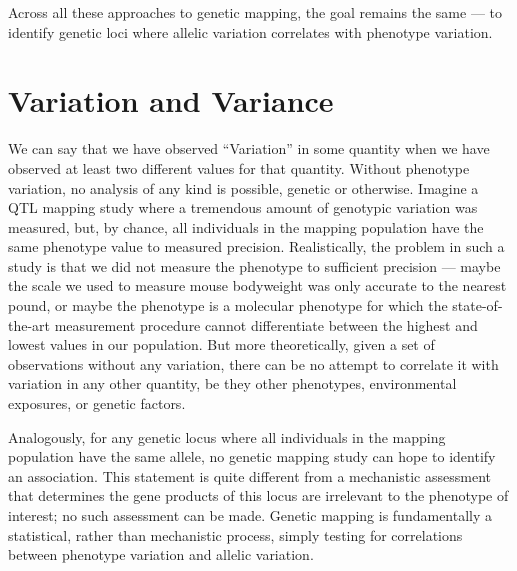

Across all these approaches to genetic mapping, the goal remains the same --- to identify genetic loci where allelic variation correlates with phenotype variation.

\section{Variation and Variance}

We can say that we have observed ``Variation'' in some quantity when we have observed at least two different values for that quantity.
Without phenotype variation, no analysis of any kind is possible, genetic or otherwise.
Imagine a QTL mapping study where a tremendous amount of genotypic variation was measured, but, by chance, all individuals in the mapping population have the same phenotype value to measured precision.
Realistically, the problem in such a study is that we did not measure the phenotype to sufficient precision --- maybe the scale we used to measure mouse bodyweight was only accurate to the nearest pound, or maybe the phenotype is a molecular phenotype for which the state-of-the-art measurement procedure cannot differentiate between the highest and lowest values in our population.
But more theoretically, given a set of observations without any variation, there can be no attempt to correlate it with variation in any other quantity, be they other phenotypes, environmental exposures, or genetic factors.

Analogously, for any genetic locus where all individuals in the mapping population have the same allele, no genetic mapping study can hope to identify an association.
This statement is quite different from a mechanistic assessment that determines the gene products of this locus are irrelevant to the phenotype of interest; no such assessment can be made.
Genetic mapping is fundamentally a statistical, rather than mechanistic process, simply testing for correlations between phenotype variation and allelic variation.

